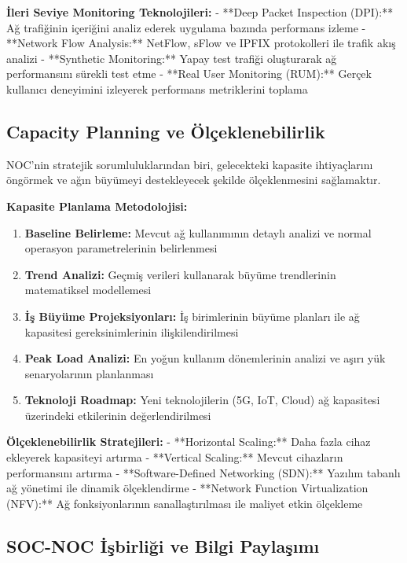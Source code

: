 \textbf{İleri Seviye Monitoring Teknolojileri:}
- **Deep Packet Inspection (DPI):** Ağ trafiğinin içeriğini analiz ederek uygulama bazında performans izleme
- **Network Flow Analysis:** NetFlow, sFlow ve IPFIX protokolleri ile trafik akış analizi
- **Synthetic Monitoring:** Yapay test trafiği oluşturarak ağ performansını sürekli test etme
- **Real User Monitoring (RUM):** Gerçek kullanıcı deneyimini izleyerek performans metriklerini toplama

\subsection{Capacity Planning ve Ölçeklenebilirlik}

NOC'nin stratejik sorumluluklarından biri, gelecekteki kapasite ihtiyaçlarını öngörmek ve ağın büyümeyi destekleyecek şekilde ölçeklenmesini sağlamaktır.

\textbf{Kapasite Planlama Metodolojisi:}
\begin{enumerate}
    \item \textbf{Baseline Belirleme:} Mevcut ağ kullanımının detaylı analizi ve normal operasyon parametrelerinin belirlenmesi
    \item \textbf{Trend Analizi:} Geçmiş verileri kullanarak büyüme trendlerinin matematiksel modellemesi
    \item \textbf{İş Büyüme Projeksiyonları:} İş birimlerinin büyüme planları ile ağ kapasitesi gereksinimlerinin ilişkilendirilmesi
    \item \textbf{Peak Load Analizi:} En yoğun kullanım dönemlerinin analizi ve aşırı yük senaryolarının planlanması
    \item \textbf{Teknoloji Roadmap:} Yeni teknolojilerin (5G, IoT, Cloud) ağ kapasitesi üzerindeki etkilerinin değerlendirilmesi
\end{enumerate}

\textbf{Ölçeklenebilirlik Stratejileri:}
- **Horizontal Scaling:** Daha fazla cihaz ekleyerek kapasiteyi artırma
- **Vertical Scaling:** Mevcut cihazların performansını artırma
- **Software-Defined Networking (SDN):** Yazılım tabanlı ağ yönetimi ile dinamik ölçeklendirme
- **Network Function Virtualization (NFV):** Ağ fonksiyonlarının sanallaştırılması ile maliyet etkin ölçekleme

\subsection{SOC-NOC İşbirliği ve Bilgi Paylaşımı}

